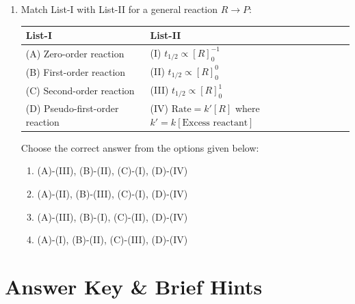 \documentclass[11pt, a4paper]{article}
\begin{document}
\begin{enumerate}
\item Match List-I with List-II for a general reaction $R \rightarrow P$:
\begin{center}
\begin{tabular}{|l|l|}
\hline
\textbf{List-I} & \textbf{List-II} \\
\hline
(A) Zero-order reaction & (I) $t_{1/2} \propto [R]_0^{-1}$ \\
(B) First-order reaction & (II) $t_{1/2} \propto [R]_0^0$ \\
(C) Second-order reaction & (III) $t_{1/2} \propto [R]_0^1$ \\
(D) Pseudo-first-order reaction & (IV) $\text{Rate} = k'[R]$ where $k' = k[\text{Excess reactant}]$ \\
\hline
\end{tabular}
\end{center}
Choose the correct answer from the options given below:
\begin{enumerate}
    \item (A)-(III), (B)-(II), (C)-(I), (D)-(IV)
    \item (A)-(II), (B)-(III), (C)-(I), (D)-(IV)
    \item (A)-(III), (B)-(I), (C)-(II), (D)-(IV)
    \item (A)-(I), (B)-(II), (C)-(III), (D)-(IV)
\end{enumerate}

\end{enumerate}

\newpage
\section*{Answer Key \& Brief Hints}
\end{document}
